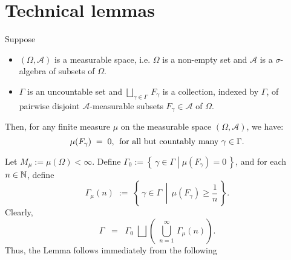 

\section{Technical lemmas}
\setcounter{theorem}{0}
\setcounter{equation}{0}


\renewcommand{\theenumi}{\roman{enumi}}
\renewcommand{\labelenumi}{\textnormal{(\theenumi)}$\;\;$}


\begin{lemma}
\label{LemmaUncountablePartition}
\mbox{}
\vskip 0.1cm
\noindent
Suppose
\begin{itemize}
\item	$\left(\Omega,\mathcal{A}\right)$ is a measurable space,
		i.e. $\Omega$ is a non-empty set and $\mathcal{A}$ is a $\sigma$-algebra of subsets of $\Omega$.
\item	$\Gamma$ is an uncountable set and
		$\underset{\gamma\in\Gamma}{\bigsqcup}\,F_{\gamma}$ is a collection,
		indexed by $\Gamma$, of pairwise disjoint $\mathcal{A}$-measurable subsets
		$F_{\gamma} \in \mathcal{A}$ of $\Omega$.
\end{itemize}
Then, for any finite measure $\mu$ on the measurable space $\left(\Omega,\mathcal{A}\right)$,
we have:
\begin{equation*}
\mu\!\left(F_{\gamma}\right) \; = \; 0,
\;\,\textnormal{for all but countably many $\gamma \in \Gamma$}.
\end{equation*}
\end{lemma}
\proof
Let $M_{\mu} := \mu(\Omega) < \infty$. Define
$\Gamma_{0} := \left\{\,\gamma\in\Gamma\;\left\vert\;\mu(F_{\gamma}) = 0\right.\,\right\}$,
and for each $n \in \mathbb{N}$, define
\begin{equation*}
\Gamma_{\mu}(n) \; := \; \left\{\,\gamma\in\Gamma\;\,\left\vert\;\,\mu(F_{\gamma}) \geq \dfrac{1}{n}\right.\,\right\}.
\end{equation*}
Clearly,
\begin{equation*}
\Gamma \;\; = \;\; \Gamma_{0}\;\bigsqcup\left(\;\bigcup_{n=1}^{\infty}\,\Gamma_{\mu}(n)\right).
\end{equation*}
Thus, the Lemma follows immediately from the following

